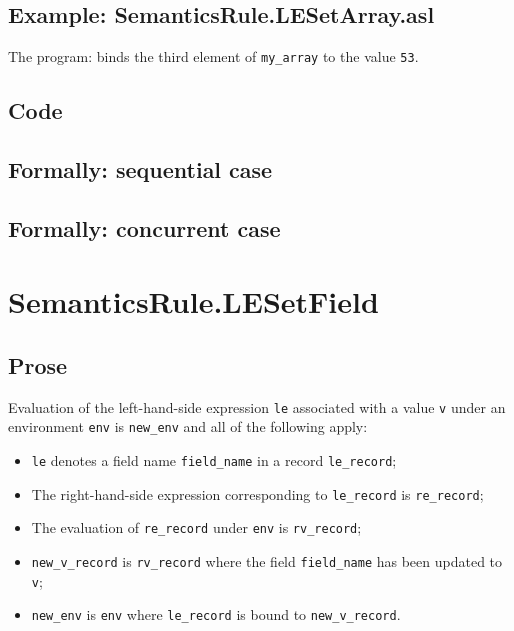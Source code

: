 \documentclass{book}
\begin{document}
    \subsection{Example: SemanticsRule.LESetArray.asl}
    The program:
    binds the third element of \texttt{my\_array} to the value \texttt{53}.

  \subsection{Code}

\begin{emptyformal}
  \subsection{Formally: sequential case}

  \subsection{Formally: concurrent case}
\end{emptyformal}


\section{SemanticsRule.LESetField \label{sec:SemanticsRule.LESetField}}

    \subsection{Prose}
    Evaluation of the left-hand-side expression \texttt{le} associated with a
value \texttt{v} under an environment \texttt{env} is \texttt{new\_env} and all
of the following apply:
    \begin{itemize}
    \item \texttt{le} denotes a field name \texttt{field\_name} in a record \texttt{le\_record};
    \item The right-hand-side expression corresponding to \texttt{le\_record} is
      \texttt{re\_record};
    \item The evaluation of \texttt{re\_record} under \texttt{env} is \texttt{rv\_record};
    \item \texttt{new\_v\_record} is \texttt{rv\_record} where the field \texttt{field\_name} has been
      updated to \texttt{v};
    \item \texttt{new\_env} is \texttt{env} where \texttt{le\_record} is bound to
      \texttt{new\_v\_record}.
    \end{itemize}
\end{document}
